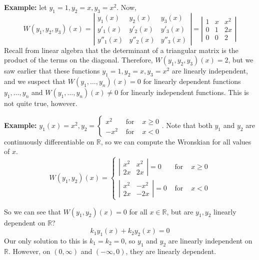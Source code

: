 \documentclass[11pt]{article}
\newcommand{\example}{\textbf{Example: }}
\begin{document}
	\example let $y_1 = 1, y_2 = x, y_3 = x^2$. Now,
		$$ W(y_1, y_2, y_3)(x) =
			\left|
				\begin{array}{ccc}
					y_1 (x) & y_2 (x) & y_3 (x) \\
					y'_1 (x) & y'_2 (x) & y'_3 (x) \\
					y''_1 (x) & y''_2 (x) & y''_3 (x)
				\end{array}
			\right| =
			\left|
				\begin{array}{ccc}
					1 & x & x^2 \\
					0 & 1 & 2x \\
					0 & 0 & 2
				\end{array}
			\right|
		$$
		Recall from linear algebra that the determinant of a triangular matrix is the product of the terms on the diagonal. Therefore, $W(y_1, y_2, y_3)(x) = 2$, but we saw earlier that these functions $y_1 = 1, y_2 = x, y_3 = x^2$ are linearly independent, and we suspect that $W(y_1, \ldots, y_n)(x) = 0$ for linearly dependent functions $y_1, \ldots, y_n$ and $W(y_1, \ldots, y_n)(x) \neq 0$ for linearly independent functions. This is not quite true, however.

	\example $y_1 (x) = x^2, y_2 = \left\{ \begin{array}{ccc} x^2 & \text{ for } & x \geq 0 \\ - x^2 & \text{ for } & x < 0 \end{array} \right. $. Note that both $y_1$ and $y_2$ are continuously differentiable on $\mathbb{R}$, so we can compute the Wronskian for all values of $x$.
		$$ W(y_1,  y_2)(x) =
			\left\{
				\begin{array}{ccc}
					\left|
						\begin{array}{cc}
							x^2 & x^2 \\
							2x & 2x
						\end{array}
					\right| = 0 & \text{ for } & x \geq 0 \\
					\left|
						\begin{array}{cc}
							x^2 & -x^2 \\
							2x & -2x
						\end{array}
					\right| = 0 & \text{ for } & x < 0
				\end{array}
			\right.
		$$

	So we can see that $W(y_1, y_2)(x) = 0$ for all $x \in \mathbb{R}$, but are $y_1, y_2$ linearly dependent on $\mathbb{R}$?
		$$ k_1 y_1 (x) + k_2 y_2 (x) = 0 $$
	Our only solution to this is $k_1 = k_2 = 0$, so $y_1$ and $y_2$ are linearly independent on $\mathbb{R}$. However, on $(0, \infty)$ and $(-\infty,0)$, they are linearly dependent.
\end{document}
